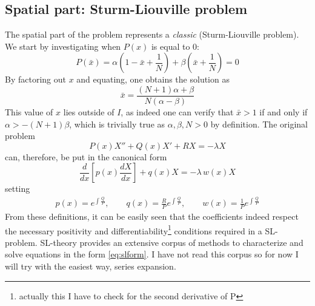 \documentclass{article}
\newcommand{\red}[1]{{\color{red}#1}}
\begin{document}
	\subsection{Spatial part: Sturm-Liouville problem}
	The spatial part of the problem represents a \textit{classic}
	(Sturm-Liouville problem).
	We start by investigating when $P(x)$ is equal to $0$:
	\begin{equation*}
		P(\bar{x}) = \alpha\left(1-\bar{x}+\frac{1}{N}\right) + \beta
		\left(\bar{x} + \frac{1}{N}\right)
		= 0
	\end{equation*}
	By factoring out $x$ and equating, one obtains the solution as
	\begin{equation*}
		\bar{x} = \frac{(N+1) \alpha + \beta}{N (\alpha - \beta)}
	\end{equation*}
	This value of $x$ lies outside of $I$, as indeed one can verify that
	$\bar{x} > 1$ if and only if $\alpha > - (N+1) \beta$, which is trivially
	true as $\alpha, \beta, N > 0$ by definition.
	The original problem
	\begin{equation}\label{eq:clearform}
		P(x) X '' + Q(x) X' + R X = -\lambda X
	\end{equation}
	can, therefore, be put in the canonical form
	\begin{equation}\label{eq:slform}
		\frac{d}{dx}\left[p(x) \frac{dX}{dx} \right] + q(x) X = -\lambda \, w(x) X
	\end{equation}
	setting
	\begin{align*}
		p(x) = e^{\int \frac{Q}{P}}, \qquad
		q(x) = \frac{R}{P}e^{\int \frac{Q}{P}}, \qquad
		w(x) = \frac{1}{P}e^{\int \frac{Q}{P}}
	\end{align*}
	From these definitions, it can be easily seen that the coefficients indeed
	respect the necessary positivity and differentiability\footnote{actually
	this I have to check for the second derivative of P} conditions required in a
	SL-problem.
	\red{SL-theory provides an extensive corpus of methods to characterize and
	solve equations in the form \eqref{eq:slform}. I have not read this
	corpus so for now I will try with the easiest way, series expansion.}
\end{document}
